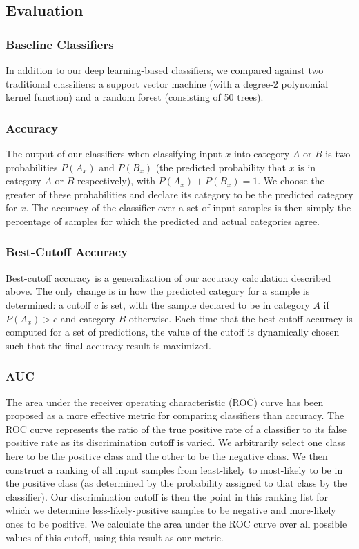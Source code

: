 \documentclass{article} %
\begin{document}
\subsection{Evaluation}
\subsubsection{Baseline Classifiers}
In addition to our deep learning-based classifiers, we compared against two traditional classifiers: a support vector machine (with a degree-2 polynomial kernel function) and a random forest (consisting of 50 trees).
\subsubsection{Accuracy}
The output of our classifiers when classifying input $x$ into category $A$ or $B$ is two probabilities $P(A_x)$ and $P(B_x)$ (the predicted probability that $x$ is in category $A$ or $B$ respectively), with $P(A_x)+P(B_x)=1$.  We choose the greater of these probabilities and declare its category to be the predicted category for $x$.  The accuracy of the classifier over a set of input samples is then simply the percentage of samples for which the predicted and actual categories agree.
\subsubsection{Best-Cutoff Accuracy}
Best-cutoff accuracy is a generalization of our accuracy calculation described above.  The only change is in how the predicted category for a sample is determined: a cutoff $c$ is set, with the sample declared to be in category $A$ if $P(A_x) > c$ and category $B$ otherwise.  Each time that the best-cutoff accuracy is computed for a set of predictions, the value of the cutoff is dynamically chosen such that the final accuracy result is maximized.
\subsubsection{AUC}
The area under the receiver operating characteristic (ROC) curve has been proposed \cite{DBLP:conf/ijcai/LingHZ03} as a more effective metric for comparing classifiers than accuracy.  The ROC curve represents the ratio of the true positive rate of a classifier to its false positive rate as its discrimination cutoff is varied.  We arbitrarily select one class here to be the positive class and the other to be the negative class.  We then construct a ranking of all input samples from least-likely to most-likely to be in the positive class (as determined by the probability assigned to that class by the classifier).  Our discrimination cutoff is then the point in this ranking list for which we determine less-likely-positive samples to be negative and more-likely ones to be positive.  We calculate the area under the ROC curve over all possible values of this cutoff, using this result as our metric.
\end{document}
